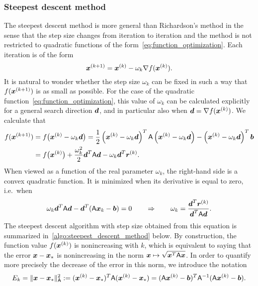\subsubsection{Steepest descent method}%
\label{ssub:steepest_descent_method}

The steepest descent method is more general than Richardson's method in the sense that
the step size changes from iteration to iteration
and the method is not restricted to quadratic functions of the form~\eqref{eq:function_optimization}.
Each iteration is of the form
\[
    \mathbf{\boldsymbol{x}}^{(k+1)} = \mathbf{\boldsymbol{x}}^{(k)} - \omega_k \nabla f(\mathbf{\boldsymbol{x}}^{(k)}).
\]
It is natural to wonder whether the step size $\omega_k$ can be fixed in such a way that
$f(\mathbf{\boldsymbol{x}}^{(k+1)})$ is as small as possible.
For the case of the quadratic function~\eqref{eq:function_optimization},
this value of $\omega_k$ can be calculated explicitly for a general search direction $\mathbf{\boldsymbol{d}}$,
and in particular also when $\mathbf{\boldsymbol{d}} = \nabla f(\mathbf{\boldsymbol{x}}^{(k)})$.
We calculate that
\begin{align}
    \notag
    f(\mathbf{\boldsymbol{x}}^{(k+1)})
    &= f\bigl(\mathbf{\boldsymbol{x}}^{(k)} - \omega_k \mathbf{\boldsymbol{d}}\bigr) = \frac{1}{2} \left( \mathbf{\boldsymbol{x}}^{(k)} - \omega_k \mathbf{\boldsymbol{d}}\right)^T \mathsf A \left(\mathbf{\boldsymbol{x}}^{(k)} - \omega_k \mathbf{\boldsymbol{d}}\right) - \left(\mathbf{\boldsymbol{x}}^{(k)} - \omega_k \mathbf{\boldsymbol{d}}\right)^T \mathbf{\boldsymbol{b}} \\
    \label{eq:linear_steepest}
    &= f\bigl( \mathbf{\boldsymbol{x}}^{(k)} \bigr) + \frac{\omega_k^2}{2} \mathbf{\boldsymbol{d}}^T \mathsf A \mathbf{\boldsymbol{d}} - \omega_k \mathbf{\boldsymbol{d}}^T \mathbf{\boldsymbol{r}}^{(k)}.
\end{align}
When viewed as a function of the real parameter $\omega_k$,
the right-hand side is a convex quadratic function.
It is minimized when its derivative is equal to zero,
i.e.\ when
\begin{equation}
    \label{eq:linear_optimal_step_size_steepest_descent}
    \omega_k \mathbf{\boldsymbol{d}}^T \mathsf A \mathbf{\boldsymbol{d}} - \mathbf{\boldsymbol{d}}^T (\mathsf A \mathbf{\boldsymbol{x}}_k - \mathbf{\boldsymbol{b}}) = 0
    \qquad \Rightarrow  \qquad \omega_k = \frac{\mathbf{\boldsymbol{d}}^T \mathbf{\boldsymbol{r}}^{(k)}}{\mathbf{\boldsymbol{d}}^T \mathsf A \mathbf{\boldsymbol{d}}}.
\end{equation}
The steepest descent algorithm with step size obtained from this equation is summarized in~\cref{algo:steepest_descent_method} below.
By construction,
the function value $f(\mathbf{\boldsymbol{x}}^{(k)})$ is nonincreasing with $k$,
which is equivalent to saying that
the error $\mathbf{\boldsymbol{x}} - \mathbf{\boldsymbol{x}}_*$ is nonincreasing in the norm $\mathbf{\boldsymbol{x}} \mapsto \sqrt{\mathbf{\boldsymbol{x}}^T \mathsf A \mathbf{\boldsymbol{x}}}$.
In order to quantify more precisely the decrease of the error in this norm,
we introduce the notation
\[
    E_k = \lVert\mathbf{\boldsymbol{x}} - \mathbf{\boldsymbol{x}}_*\rVert^2_{\mathsf A} := (\mathbf{\boldsymbol{x}}^{(k)} - \mathbf{\boldsymbol{x}}_*)^T \mathsf A (\mathbf{\boldsymbol{x}}^{(k)} - \mathbf{\boldsymbol{x}}_*)
    = (\mathsf A \mathbf{\boldsymbol{x}}^{(k)} - \mathbf{\boldsymbol{b}})^T \mathsf A^{-1} (\mathsf A \mathbf{\boldsymbol{x}}^{(k)} - \mathbf{\boldsymbol{b}}).
\]
